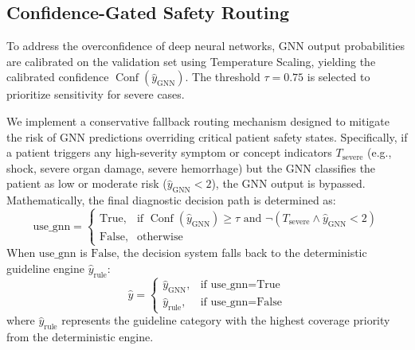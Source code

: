 \documentclass[conference]{IEEEtran}
\begin{document}
\subsection{Confidence-Gated Safety Routing}
To address the overconfidence of deep neural networks, GNN output probabilities are calibrated on the validation set using Temperature Scaling, yielding the calibrated confidence $\operatorname{Conf}(\hat{y}_{\text{GNN}})$. The threshold $\tau = 0.75$ is selected to prioritize sensitivity for severe cases. 

We implement a conservative fallback routing mechanism designed to mitigate the risk of GNN predictions overriding critical patient safety states. Specifically, if a patient triggers any high-severity symptom or concept indicators $T_{\text{severe}}$ (e.g., shock, severe organ damage, severe hemorrhage) but the GNN classifies the patient as low or moderate risk ($\hat{y}_{\text{GNN}} < 2$), the GNN output is bypassed. Mathematically, the final diagnostic decision path is determined as:
\begin{equation}
    \text{use\_gnn} = \begin{cases}
    \text{True}, & \text{if } \operatorname{Conf}(\hat{y}_{\text{GNN}}) \ge \tau \text{ and } \neg (T_{\text{severe}} \land \hat{y}_{\text{GNN}} < 2) \\
    \text{False}, & \text{otherwise}
    \end{cases}
\end{equation}
When $\text{use\_gnn}$ is $\text{False}$, the decision system falls back to the deterministic guideline engine $\hat{y}_{\text{rule}}$:
\begin{equation}
    \hat{y} = \begin{cases}
    \hat{y}_{\text{GNN}}, & \text{if } \text{use\_gnn} = \text{True} \\
    \hat{y}_{\text{rule}}, & \text{if } \text{use\_gnn} = \text{False}
    \end{cases}
\end{equation}
where $\hat{y}_{\text{rule}}$ represents the guideline category with the highest coverage priority from the deterministic engine.
\end{document}
